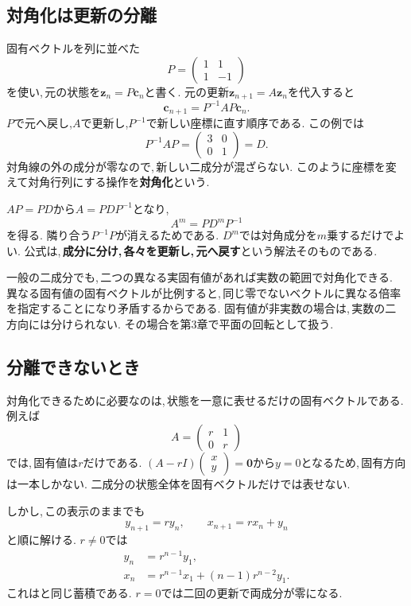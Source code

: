 \subsection{対角化は更新の分離}\label{節：対角化}

固有ベクトルを列に並べた
\[
 P=\begin{pmatrix}1&1\\1&-1\end{pmatrix}
\]
を使い,\,元の状態を$\boldsymbol z_n=P\boldsymbol c_n$と書く.
元の更新$\boldsymbol z_{n+1}=A\boldsymbol z_n$を代入すると
\[
 \boldsymbol c_{n+1}=P^{-1}AP\boldsymbol c_n.
\]
$P$で元へ戻し,$A$で更新し,$P^{-1}$で新しい座標に直す順序である.
この例では
\[
 P^{-1}AP=\begin{pmatrix}3&0\\0&1\end{pmatrix}=D.
\]
対角線の外の成分が零なので,\,新しい二成分が混ざらない.
このように座標を変えて対角行列にする操作を\textbf{対角化}という.

$AP=PD$から$A=PDP^{-1}$となり,
\[
 A^m=PD^mP^{-1}
\]
を得る. 隣り合う$P^{-1}P$が消えるためである.
$D^m$では対角成分を$m$乗するだけでよい.
公式は,\,\textbf{成分に分け,\,各々を更新し,\,元へ戻す}という解法そのものである.

一般の二成分でも,\,二つの異なる実固有値があれば実数の範囲で対角化できる.
異なる固有値の固有ベクトルが比例すると,\,同じ零でないベクトルに異なる倍率を指定することになり矛盾するからである.
固有値が非実数の場合は,\,実数の二方向には分けられない.
その場合を第3章で平面の回転として扱う.

\subsection{分離できないとき}

対角化できるために必要なのは,\,状態を一意に表せるだけの固有ベクトルである.
例えば
\[
 A=\begin{pmatrix}r&1\\0&r\end{pmatrix}
\]
では,\,固有値は$r$だけである.
$(A-rI)\begin{pmatrix}x\\y\end{pmatrix}=\boldsymbol0$から$y=0$となるため,\,固有方向は一本しかない.
二成分の状態全体を固有ベクトルだけでは表せない.

しかし,\,この表示のままでも
\[
 y_{n+1}=ry_n,\qquad x_{n+1}=rx_n+y_n
\]
と順に解ける.
$r\ne0$では
\[
 \begin{aligned}
 y_n&=r^{n-1}y_1,\\
 x_n&=r^{n-1}x_1+(n-1)r^{n-2}y_1.
 \end{aligned}
\]
これはと同じ蓄積である.
$r=0$では二回の更新で両成分が零になる.


